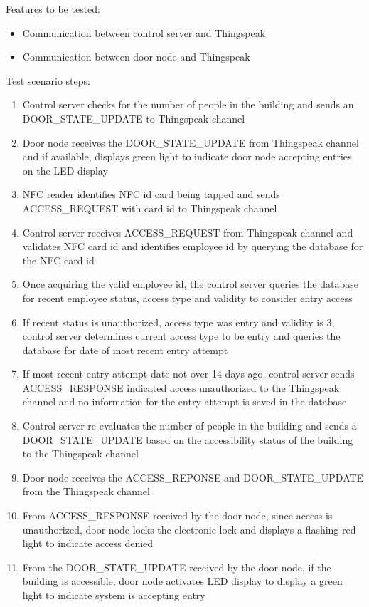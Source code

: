\noindent
Features to be tested:
\begin{itemize}
    \item Communication between control server and Thingspeak
    \item Communication between door node and Thingspeak
\end{itemize}

\noindent
Test scenario steps:
\begin{enumerate}
    \item Control server checks for the number of people in the building and
          sends an DOOR\_STATE\_UPDATE to Thingspeak channel
    \item Door node receives the DOOR\_STATE\_UPDATE from Thingspeak channel and
          if available, displays green light to indicate door node accepting
          entries on the LED display
    \item NFC reader identifies NFC id card being tapped and sends
          ACCESS\_REQUEST with card id to Thingspeak channel
    \item Control server receives ACCESS\_REQUEST from Thingspeak channel and
          validates NFC card id and identifies employee id by querying the
          database for the NFC card id 
    \item Once acquiring the valid employee id, the control server queries the
          database for recent employee status, access type and validity to
          consider entry access
    \item If recent status is unauthorized, access type was entry and validity
          is 3, control server determines current access type to be entry and
          queries the database for date of most recent entry attempt
    \item If most recent entry attempt date not over 14 days ago, control server
          sends ACCESS\_RESPONSE indicated access unauthorized to the Thingspeak
          channel and no information for the entry attempt is saved in the
          database
    \item Control server re-evaluates the number of people in the building and
          sends a DOOR\_STATE\_UPDATE based on the accessibility status of the
          building to the Thingspeak channel
    \item Door node receives the ACCESS\_REPONSE and DOOR\_STATE\_UPDATE from
          the Thingspeak channel
    \item From ACCESS\_RESPONSE received by the door node, since access is
          unauthorized, door node locks the electronic lock and displays a
          flashing red light to indicate access denied 
    \item From the DOOR\_STATE\_UPDATE received by the door node, if the
          building is accessible, door node activates LED display to display a
          green light to indicate system is accepting entry
\end{enumerate}

